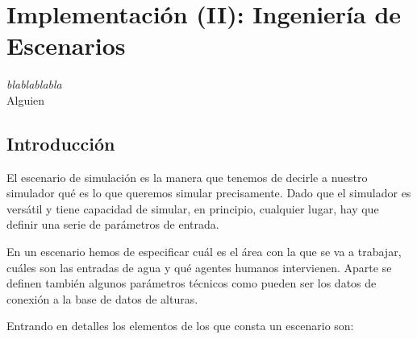 \chapter*{Implementación (II): Ingeniería de Escenarios} \label{cap5b}

\begin{flushright}
\begin{minipage}{7.85cm}
    {\em blablablabla} \\  Alguien %
\end{minipage}
\end{flushright}

\vspace*{5mm}

\section{Introducción}

El escenario de simulación es la manera que tenemos de decirle a nuestro
simulador qué es lo que queremos simular precisamente. Dado que el simulador es
versátil y tiene capacidad de simular, en principio, cualquier lugar, hay que
definir una serie de parámetros de entrada.

En un escenario hemos de especificar cuál es el área con la que se va a
trabajar, cuáles son las entradas de agua y qué agentes humanos intervienen.
Aparte se definen también algunos parámetros técnicos como pueden ser los datos
de conexión a la base de datos de alturas.

Entrando en detalles los elementos de los que consta un escenario son:

